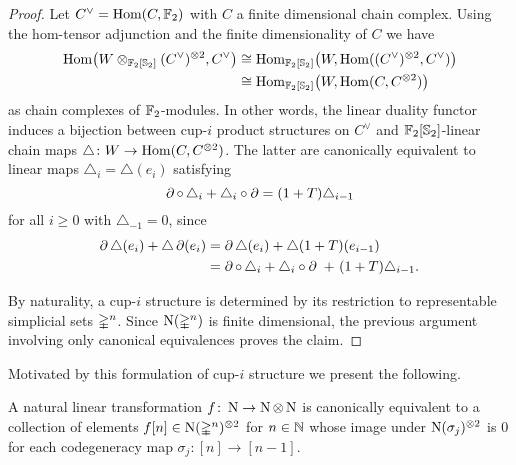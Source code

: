 \begin{proof}
	Let $C^\vee = \mathrm{Hom}(C, {\mathbb{F}_2})$ with $C$ a finite dimensional chain complex.
	Using the hom-tensor adjunction and the finite dimensionality of $C$ we have
	\begin{align*}
	\mathrm{Hom} \big(W \otimes_{{\mathbb{F}_2}[\mathbb{S}_2]} (C^\vee)^{\otimes 2}, C^\vee \big) & \cong
	\mathrm{Hom}_{{\mathbb{F}_2}[\mathbb{S}_2]} \big( W, \mathrm{Hom}((C^\vee)^{\otimes 2}, C^\vee) \big) \\ & \cong
	\mathrm{Hom}_{{\mathbb{F}_2}[\mathbb{S}_2]} \big( W, \mathrm{Hom}(C, C^{\otimes 2}) \big)
	\end{align*}
	as chain complexes of ${\mathbb{F}_2}$-modules.
	In other words, the linear duality functor induces a bijection between \mbox{cup-$i$} product structures on $C^\vee$ and ${\mathbb{F}_2}[\mathbb{S}_2]$-linear chain maps $\triangle \colon W \to \mathrm{Hom}(C, C^{\otimes 2})$.
	The latter are canonically equivalent to linear maps $\triangle_i = \triangle(e_i)$ satisfying
	\[
	\operatorname{\partial} \circ \, \triangle_i + \triangle_i \circ \operatorname{\partial} =
	(1+T) \triangle_{i-1}
	\]
	for all $i \geq 0$ with $\triangle_{-1} = 0$, since
	\begin{align*}
	\operatorname{\partial} \triangle (e_i) + \triangle \operatorname{\partial}(e_i) &=
	\operatorname{\partial} \triangle (e_i) + \triangle (1+T) (e_{i-1}) \\ &=
	\operatorname{\partial} \circ \, \triangle_i + \triangle_i \circ \operatorname{\partial} \ +\ (1+T) \triangle_{i-1}.
	\end{align*}

	By naturality, a \mbox{cup-$i$} structure is determined by its restriction to representable simplicial sets $\mathbb{\Delta}^n$.
	Since $\operatorname{N}(\mathbb{\Delta}^n)$ is finite dimensional, the previous argument involving only canonical equivalences proves the claim.
\end{proof}

Motivated by this formulation of \mbox{cup-$i$} structure we present the following.

\begin{lemma} \label{l:natural}
	A natural linear transformation $f \colon \operatorname{N} \to \operatorname{N} \otimes \operatorname{N}$ is canonically equivalent to a collection of elements $f[n] \in \operatorname{N}(\mathbb{\Delta}^n)^{\otimes 2}$	for $n \in \mathbb{N}$ whose image under $\operatorname{N}(\sigma_j)^{\otimes 2}$ is $0$
	for each codegeneracy map $\sigma_j \colon [n] \to [n-1]$.
\end{lemma}

